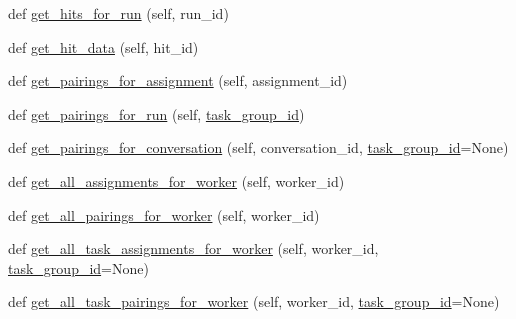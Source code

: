 \begin{DoxyCompactItemize}
\item 
def \hyperlink{classparlai_1_1mturk_1_1core_1_1legacy__2018_1_1mturk__data__handler_1_1MTurkDataHandler_afaf45ff6c49973482b7059a4f047b3ec}{get\+\_\+hits\+\_\+for\+\_\+run} (self, run\+\_\+id)
\item 
def \hyperlink{classparlai_1_1mturk_1_1core_1_1legacy__2018_1_1mturk__data__handler_1_1MTurkDataHandler_af5022ecc9bec7461912ae7439d6543cc}{get\+\_\+hit\+\_\+data} (self, hit\+\_\+id)
\item 
def \hyperlink{classparlai_1_1mturk_1_1core_1_1legacy__2018_1_1mturk__data__handler_1_1MTurkDataHandler_a1ca83cec6867537d2a72e47beee0ca84}{get\+\_\+pairings\+\_\+for\+\_\+assignment} (self, assignment\+\_\+id)
\item 
def \hyperlink{classparlai_1_1mturk_1_1core_1_1legacy__2018_1_1mturk__data__handler_1_1MTurkDataHandler_acdb06b52aa67442098fc2856deee1ce7}{get\+\_\+pairings\+\_\+for\+\_\+run} (self, \hyperlink{classparlai_1_1mturk_1_1core_1_1legacy__2018_1_1mturk__data__handler_1_1MTurkDataHandler_ab743471dc641c785f93d9c1285967162}{task\+\_\+group\+\_\+id})
\item 
def \hyperlink{classparlai_1_1mturk_1_1core_1_1legacy__2018_1_1mturk__data__handler_1_1MTurkDataHandler_adeb795898ba871fdb1ea3bb7517286d3}{get\+\_\+pairings\+\_\+for\+\_\+conversation} (self, conversation\+\_\+id, \hyperlink{classparlai_1_1mturk_1_1core_1_1legacy__2018_1_1mturk__data__handler_1_1MTurkDataHandler_ab743471dc641c785f93d9c1285967162}{task\+\_\+group\+\_\+id}=None)
\item 
def \hyperlink{classparlai_1_1mturk_1_1core_1_1legacy__2018_1_1mturk__data__handler_1_1MTurkDataHandler_a7cf4512d458d9e2d2867f4252f1ac2f9}{get\+\_\+all\+\_\+assignments\+\_\+for\+\_\+worker} (self, worker\+\_\+id)
\item 
def \hyperlink{classparlai_1_1mturk_1_1core_1_1legacy__2018_1_1mturk__data__handler_1_1MTurkDataHandler_ac4805766f3155d1768d3aff70aaf404c}{get\+\_\+all\+\_\+pairings\+\_\+for\+\_\+worker} (self, worker\+\_\+id)
\item 
def \hyperlink{classparlai_1_1mturk_1_1core_1_1legacy__2018_1_1mturk__data__handler_1_1MTurkDataHandler_aff3a140237918d45b8ba6772b4d9473b}{get\+\_\+all\+\_\+task\+\_\+assignments\+\_\+for\+\_\+worker} (self, worker\+\_\+id, \hyperlink{classparlai_1_1mturk_1_1core_1_1legacy__2018_1_1mturk__data__handler_1_1MTurkDataHandler_ab743471dc641c785f93d9c1285967162}{task\+\_\+group\+\_\+id}=None)
\item 
def \hyperlink{classparlai_1_1mturk_1_1core_1_1legacy__2018_1_1mturk__data__handler_1_1MTurkDataHandler_ae5c1f4e4db038e23d1bd2abd6d6c35cd}{get\+\_\+all\+\_\+task\+\_\+pairings\+\_\+for\+\_\+worker} (self, worker\+\_\+id, \hyperlink{classparlai_1_1mturk_1_1core_1_1legacy__2018_1_1mturk__data__handler_1_1MTurkDataHandler_ab743471dc641c785f93d9c1285967162}{task\+\_\+group\+\_\+id}=None)
\end{DoxyCompactItemize}
